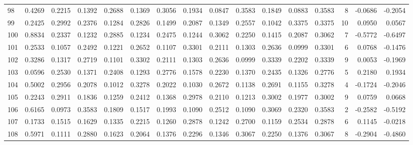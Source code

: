 \begin{tabular}{lrrrrrrrrrrrrrrr}
98  &      0.4269 &  0.2215 &  0.1392 &  0.2688 &  0.1369 &  0.3056 &  0.1934 &  0.0847 &  0.3583 &  0.1849 &   0.0883 &     0.3583 &      8 &                   -0.0686 &                    -0.2054 \\
99  &      0.2425 &  0.2992 &  0.2376 &  0.1284 &  0.2826 &  0.1499 &  0.2087 &  0.1349 &  0.2557 &  0.1042 &   0.3375 &     0.3375 &     10 &                    0.0950 &                     0.0567 \\
100 &      0.8834 &  0.2337 &  0.1232 &  0.2885 &  0.1234 &  0.2475 &  0.1244 &  0.3062 &  0.2250 &  0.1415 &   0.2087 &     0.3062 &      7 &                   -0.5772 &                    -0.6497 \\
101 &      0.2533 &  0.1057 &  0.2492 &  0.1221 &  0.2652 &  0.1107 &  0.3301 &  0.2111 &  0.1303 &  0.2636 &   0.0999 &     0.3301 &      6 &                    0.0768 &                    -0.1476 \\
102 &      0.3286 &  0.1317 &  0.2719 &  0.1101 &  0.3302 &  0.2111 &  0.1303 &  0.2636 &  0.0999 &  0.3339 &   0.2202 &     0.3339 &      9 &                    0.0053 &                    -0.1969 \\
103 &      0.0596 &  0.2530 &  0.1371 &  0.2408 &  0.1293 &  0.2776 &  0.1578 &  0.2230 &  0.1370 &  0.2435 &   0.1326 &     0.2776 &      5 &                    0.2180 &                     0.1934 \\
104 &      0.5002 &  0.2956 &  0.2078 &  0.1012 &  0.3278 &  0.2022 &  0.1030 &  0.2672 &  0.1138 &  0.2691 &   0.1155 &     0.3278 &      4 &                   -0.1724 &                    -0.2046 \\
105 &      0.2243 &  0.2911 &  0.1836 &  0.1259 &  0.2412 &  0.1368 &  0.2978 &  0.2110 &  0.1213 &  0.3002 &   0.1977 &     0.3002 &      9 &                    0.0759 &                     0.0668 \\
106 &      0.6165 &  0.0973 &  0.3583 &  0.1809 &  0.1517 &  0.1993 &  0.1090 &  0.2512 &  0.1090 &  0.3069 &   0.2320 &     0.3583 &      2 &                   -0.2582 &                    -0.5192 \\
107 &      0.1733 &  0.1515 &  0.1629 &  0.1335 &  0.2215 &  0.1260 &  0.2878 &  0.1242 &  0.2700 &  0.1159 &   0.2534 &     0.2878 &      6 &                    0.1145 &                    -0.0218 \\
108 &      0.5971 &  0.1111 &  0.2880 &  0.1623 &  0.2064 &  0.1376 &  0.2296 &  0.1346 &  0.3067 &  0.2250 &   0.1376 &     0.3067 &      8 &                   -0.2904 &                    -0.4860 \\

\end{tabular}
